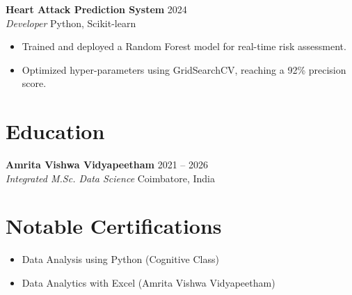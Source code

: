 \documentclass[10pt,letterpaper]{article}
\newcommand{\entry}[4]{
  \vspace{-1pt}
  \textbf{#1} \hfill #2 \\
  \textit{#3} \hfill #4 \\
  \vspace{-5pt}
}
\begin{document}
\entry{Heart Attack Prediction System}{2024}{Developer}{Python, Scikit-learn}
\begin{itemize}[noitemsep]
    \item Trained and deployed a Random Forest model for real-time risk assessment.
    \item Optimized hyper-parameters using GridSearchCV, reaching a 92\% precision score.
\end{itemize}

\section{Education}
\entry{Amrita Vishwa Vidyapeetham}{2021 -- 2026}{Integrated M.Sc. Data Science}{Coimbatore, India}

\section{Notable Certifications}
\begin{itemize}[leftmargin=*, noitemsep]
    \item Data Analysis using Python (Cognitive Class)
    \item Data Analytics with Excel (Amrita Vishwa Vidyapeetham)
\end{itemize}
\end{document}
